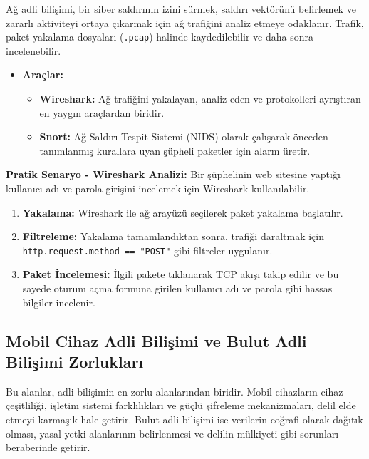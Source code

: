 \begin{itemize}
\begin{itemize}
Ağ adli bilişimi, bir siber saldırının izini sürmek, saldırı vektörünü belirlemek ve zararlı aktiviteyi ortaya çıkarmak için ağ trafiğini analiz etmeye odaklanır. Trafik, paket yakalama dosyaları (\texttt{.pcap}) halinde kaydedilebilir ve daha sonra incelenebilir.

\begin{itemize}
    \item \textbf{Araçlar:}
    \begin{itemize}
        \item \textbf{Wireshark:} Ağ trafiğini yakalayan, analiz eden ve protokolleri ayrıştıran en yaygın araçlardan biridir.
        \item \textbf{Snort:} Ağ Saldırı Tespit Sistemi (NIDS) olarak çalışarak önceden tanımlanmış kurallara uyan şüpheli paketler için alarm üretir.
    \end{itemize}
\end{itemize}
\textbf{Pratik Senaryo - Wireshark Analizi:}
Bir şüphelinin web sitesine yaptığı kullanıcı adı ve parola girişini incelemek için Wireshark kullanılabilir.
\begin{enumerate}
    \item \textbf{Yakalama:} Wireshark ile ağ arayüzü seçilerek paket yakalama başlatılır.
    \item \textbf{Filtreleme:} Yakalama tamamlandıktan sonra, trafiği daraltmak için \texttt{http.request.method == "POST"} gibi filtreler uygulanır.
    \item \textbf{Paket İncelemesi:} İlgili pakete tıklanarak TCP akışı takip edilir ve bu sayede oturum açma formuna girilen kullanıcı adı ve parola gibi hassas bilgiler incelenir.
\end{enumerate}

\subsection{Mobil Cihaz Adli Bilişimi ve Bulut Adli Bilişimi Zorlukları}

Bu alanlar, adli bilişimin en zorlu alanlarından biridir. Mobil cihazların cihaz çeşitliliği, işletim sistemi farklılıkları ve güçlü şifreleme mekanizmaları, delil elde etmeyi karmaşık hale getirir. Bulut adli bilişimi ise verilerin coğrafi olarak dağıtık olması, yasal yetki alanlarının belirlenmesi ve delilin mülkiyeti gibi sorunları beraberinde getirir.


\end{itemize}
\end{itemize}
